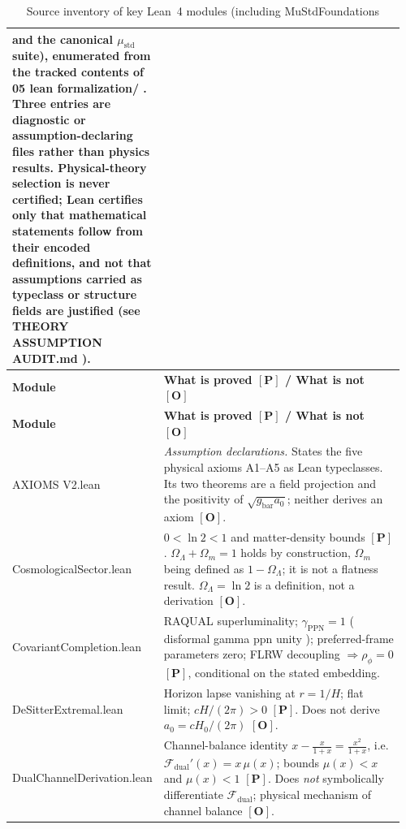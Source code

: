 \documentclass[aps,prd,preprint,superscriptaddress,nofootinbib,amsmath,amssymb,floatfix]{revtex4-2}
\makeatletter
\DeclareRobustCommand{\rntexttt}[1]{%
  \ifmmode
    \nfss@text{\ttfamily\hyphenchar\font=-1 #1}%
  \else
    \hmode@bgroup\ttfamily\hyphenchar\font=-1 #1\egroup
  \fi}
\DeclareRobustCommand{\_}{%
    \ifmmode\nfss@text{\textunderscore}\else\textunderscore\penalty\z@\fi}%
\let\texttt\rntexttt
\makeatother
\begin{document}
\footnotesize
\begin{longtable}{@{}>{\raggedright\arraybackslash}p{0.34\linewidth}>{\raggedright\arraybackslash}p{0.62\linewidth}@{}}
\caption{Source inventory of key Lean~4 modules (including \texttt{MuStdFoundations} and the canonical $\mu_{\text{std}}$ suite), enumerated from the tracked contents of \texttt{05\_lean\_formalization/}. Three entries are diagnostic or assumption-declaring files rather than physics results. Physical-theory selection is never certified; Lean certifies only that mathematical statements follow from their encoded definitions, and not that assumptions carried as typeclass or structure fields are justified (see \texttt{THEORY\_ASSUMPTION\_AUDIT.md}).}
\label{tab:lean_modules}\\
\toprule
\textbf{Module} & \textbf{What is proved $\mathbf{[P]}$ / What is not $\mathbf{[O]}$} \\
\midrule
\endfirsthead
\toprule
\textbf{Module} & \textbf{What is proved $\mathbf{[P]}$ / What is not $\mathbf{[O]}$} \\
\midrule
\endhead
\bottomrule
\endfoot
\texttt{AXIOMS\_V2.lean} & \emph{Assumption declarations.} States the five physical axioms A1--A5 as Lean typeclasses. Its two theorems are a field projection and the positivity of $\sqrt{g_{\text{bar}}a_0}$; neither derives an axiom $\mathbf{[O]}$. \\
\texttt{CosmologicalSector.lean} & $0 < \ln 2 < 1$ and matter-density bounds $\mathbf{[P]}$. $\Omega_\Lambda + \Omega_m = 1$ holds by construction, $\Omega_m$ being defined as $1-\Omega_\Lambda$; it is not a flatness result. $\Omega_\Lambda = \ln 2$ is a definition, not a derivation $\mathbf{[O]}$. \\
\texttt{Covariant\allowbreak{}Completion.lean} & RAQUAL superluminality; $\gamma_{\text{PPN}} = 1$ (\texttt{disformal\_gamma\_ppn\_unity}); preferred-frame parameters zero; FLRW decoupling $\Rightarrow \rho_\phi = 0$ $\mathbf{[P]}$, conditional on the stated embedding. \\
\texttt{DeSitterExtremal.lean} & Horizon lapse vanishing at $r = 1/H$; flat limit; $cH/(2\pi) > 0$ $\mathbf{[P]}$. Does not derive $a_0 = cH_0/(2\pi)$ $\mathbf{[O]}$. \\
\texttt{DualChannelDerivation.lean} & Channel-balance identity $x - \tfrac{x}{1+x} = \tfrac{x^2}{1+x}$, i.e. $\mathcal{F}_{\text{dual}}'(x) = x\,\mu(x)$; bounds $\mu(x) < x$ and $\mu(x) < 1$ $\mathbf{[P]}$. Does \emph{not} symbolically differentiate $\mathcal{F}_{\text{dual}}$; physical mechanism of channel balance $\mathbf{[O]}$. \\

\end{longtable}
\end{document}
